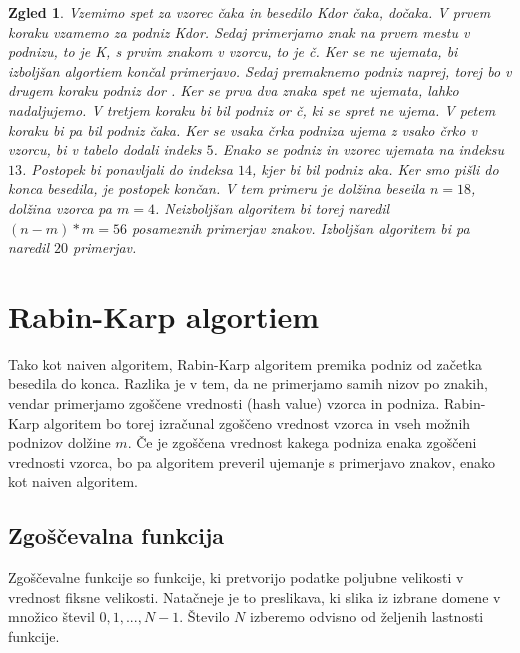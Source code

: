 \documentclass[12pt]{article}
\newtheorem{Zgled}[Izrek]{{\sc Zgled}}
\newenvironment{zgled}{\begin{Zgled}\rm}{\end{Zgled}}
\begin{document}
\begin{zgled}
  Vzemimo spet za vzorec \textit{čaka} in besedilo \textit{Kdor čaka, dočaka.}
  V prvem koraku vzamemo za podniz \textit{Kdor}. Sedaj primerjamo znak na prvem mestu v podnizu, to je \textit{K}, s prvim znakom v vzorcu,
  to je \textit{č}. Ker se ne ujemata, bi izboljšan algortiem končal primerjavo. Sedaj premaknemo podniz naprej, torej bo v drugem koraku podniz
  \textit{dor }. Ker se prva dva znaka spet ne ujemata, lahko nadaljujemo. V tretjem koraku bi bil podniz \textit{or č}, ki se spret ne ujema.
  V petem koraku bi pa bil podniz \textit{čaka}. Ker se vsaka črka podniza ujema z vsako črko v vzorcu, bi v tabelo dodali indeks $5$. Enako
  se podniz in vzorec ujemata na indeksu $13$. Postopek bi ponavljali do indeksa $14$, kjer bi bil podniz \textit{aka.} Ker smo pišli do konca besedila, je postopek končan.
  V tem primeru je dolžina beseila $n = 18$, dolžina vzorca pa $m = 4$. Neizboljšan algoritem bi torej naredil $(n - m) * m = 56$ posameznih primerjav znakov.
  Izboljšan algoritem bi pa naredil $20$ primerjav.
\end{zgled}

\section{Rabin-Karp algortiem}
Tako kot naiven algoritem, Rabin-Karp algoritem premika podniz od začetka besedila do konca. Razlika je v tem, da ne primerjamo samih nizov po znakih,
vendar primerjamo zgoščene vrednosti (hash value) vzorca in podniza. Rabin-Karp algoritem bo torej izračunal zgoščeno vrednost vzorca in
vseh možnih podnizov dolžine $m$. Če je zgoščena vrednost kakega podniza enaka zgoščeni vrednosti vzorca, bo pa algoritem preveril ujemanje s primerjavo znakov,
enako kot naiven algoritem.

\subsection{Zgoščevalna funkcija}
Zgoščevalne funkcije so funkcije, ki pretvorijo podatke poljubne velikosti v vrednost fiksne velikosti. Natačneje je to preslikava, ki slika iz
izbrane domene v množico števil ${0, 1, ...,N-1}$. Število $N$ izberemo odvisno od željenih lastnosti funkcije.
\end{document}
